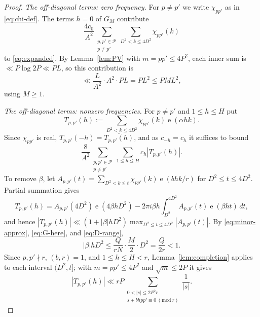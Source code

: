 \documentclass[11pt]{amsart}
\numberwithin{equation}{section}
\numberwithin{figure}{section}
\theoremstyle{definition}
\newcommand{\e}{\operatorname{e}}
\begin{document}
\begin{proof}
\medskip\noindent\emph{The off-diagonal terms: zero frequency.}
For $p\ne p'$ we write $\chi_{pp'}$ as in \eqref{eq:chi-def}.  The terms
$h=0$ of $G_M$ contribute
\[
  \frac{4c_0}{A^2}\sum_{\substack{p,p'\in\mathcal P\\p\ne p'}}
  \sum_{D^2<k\le4D^2}\chi_{pp'}(k)
\]
to \eqref{eq:expanded}.  By Lemma~\ref{lem:PV} with $m=pp'\le4P^2$,
each inner sum is $\ll P\log 2P\ll PL$, so this contribution is
\begin{equation}\label{eq:off-zero}
  \ll\frac L{A^2}\cdot A^2\cdot PL=PL^2\le PML^2,
\end{equation}
using $M\ge1$.

\medskip\noindent\emph{The off-diagonal terms: nonzero frequencies.}
For $p\ne p'$ and $1\le h\le H$ put
\[
  T_{p,p'}(h):=\sum_{D^2<k\le4D^2}\chi_{pp'}(k)\e(\alpha hk).
\]
Since $\chi_{pp'}$ is real, $T_{p,p'}(-h)=\overline{T_{p,p'}(h)}$, and
as $c_{-h}=c_h$ it suffices to bound
\begin{equation}\label{eq:off-nonzero-start}
  \frac8{A^2}\sum_{\substack{p,p'\in\mathcal P\\p\ne p'}}
  \sum_{1\le h\le H}c_h|T_{p,p'}(h)|.
\end{equation}
To remove $\beta$, let
$A_{p,p'}(t)=\sum_{D^2<k\le t}\chi_{pp'}(k)\e(bhk/r)$ for
$D^2\le t\le4D^2$.  Partial summation gives
\[
  T_{p,p'}(h)=A_{p,p'}(4D^2)\e(4\beta hD^2)
  -2\pi i\beta h\int_{D^2}^{4D^2}A_{p,p'}(t)\e(\beta ht)\,dt,
\]
and hence
$|T_{p,p'}(h)|\ll(1+|\beta|hD^2)\max_{D^2\le t\le4D^2}|A_{p,p'}(t)|$.
By \eqref{eq:minor-approx}, \eqref{eq:G-here}, and \eqref{eq:D-range},
\[
  |\beta|hD^2\le\frac Q{rN}\cdot\frac M2\cdot D^2=\frac Q{2r}<1.
\]
Since $p,p'\nmid r$, $(b,r)=1$, and $1\le h\le H<r$,
Lemma~\ref{lem:completion} applies to each interval $(D^2,t]$; with
$m=pp'\le4P^2$ and $\sqrt m\le2P$ it gives
\begin{equation}\label{eq:T-completed}
  |T_{p,p'}(h)|\ll rP\sum_{\substack{0<|s|\le2P^2r\\ s+bhpp'\equiv0\ (\mathrm{mod}\ r)}}\frac1{|s|}.
\end{equation}


\end{proof}
\end{document}
